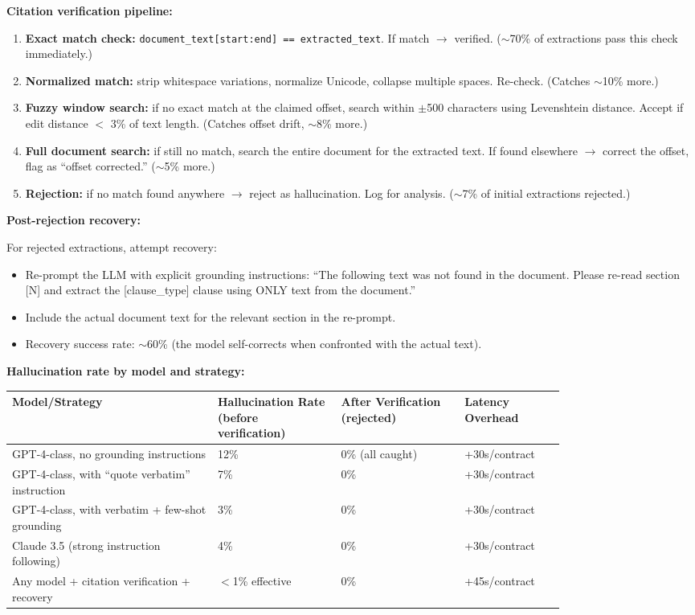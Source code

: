 \textbf{Citation verification pipeline:}

\begin{enumerate}
  \item \textbf{Exact match check:} \texttt{document\_text[start:end] == extracted\_text}. If match $\rightarrow$ verified. ($\sim$70\% of extractions pass this check immediately.)
  \item \textbf{Normalized match:} strip whitespace variations, normalize Unicode, collapse multiple spaces. Re-check. (Catches $\sim$10\% more.)
  \item \textbf{Fuzzy window search:} if no exact match at the claimed offset, search within $\pm$500 characters using Levenshtein distance. Accept if edit distance $<$ 3\% of text length. (Catches offset drift, $\sim$8\% more.)
  \item \textbf{Full document search:} if still no match, search the entire document for the extracted text. If found elsewhere $\rightarrow$ correct the offset, flag as ``offset corrected.'' ($\sim$5\% more.)
  \item \textbf{Rejection:} if no match found anywhere $\rightarrow$ reject as hallucination. Log for analysis. ($\sim$7\% of initial extractions rejected.)
\end{enumerate}

\textbf{Post-rejection recovery:}

For rejected extractions, attempt recovery:
\begin{itemize}
  \item Re-prompt the LLM with explicit grounding instructions: ``The following text was not found in the document. Please re-read section [N] and extract the [clause\_type] clause using ONLY text from the document.''
  \item Include the actual document text for the relevant section in the re-prompt.
  \item Recovery success rate: $\sim$60\% (the model self-corrects when confronted with the actual text).
\end{itemize}

\textbf{Hallucination rate by model and strategy:}

\begin{tabular}{|p{0.30\linewidth}|p{0.18\linewidth}|p{0.18\linewidth}|p{0.14\linewidth}|}
\hline
\textbf{Model/Strategy} & \textbf{Hallucination Rate (before verification)} & \textbf{After Verification (rejected)} & \textbf{Latency Overhead} \\
\hline
GPT-4-class, no grounding instructions & 12\% & 0\% (all caught) & +30s/contract \\
\hline
GPT-4-class, with ``quote verbatim'' instruction & 7\% & 0\% & +30s/contract \\
\hline
GPT-4-class, with verbatim + few-shot grounding & 3\% & 0\% & +30s/contract \\
\hline
Claude 3.5 (strong instruction following) & 4\% & 0\% & +30s/contract \\
\hline
Any model + citation verification + recovery & $<$1\% effective & 0\% & +45s/contract \\
\hline
\end{tabular}

